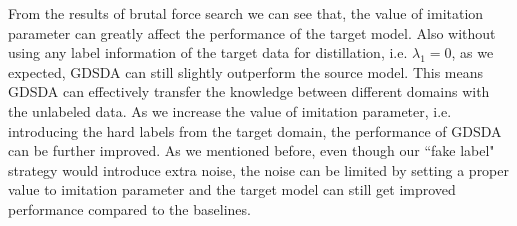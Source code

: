 From the results of brutal force search we can see that, the value of imitation parameter can greatly affect the performance of the target model.
Also without using any label information of the target data for distillation, i.e. $\lambda_1 = 0$, as we expected, GDSDA can still slightly outperform the source model. This means GDSDA can effectively transfer the knowledge between different domains with the unlabeled data. As we increase the value of imitation parameter, i.e. introducing the hard labels from the target domain, the performance of GDSDA can be further improved. As we mentioned before, even though our ``fake label" strategy would introduce extra noise, the noise can be limited by setting a proper value to imitation parameter and the target model can still get improved performance compared to the baselines.

